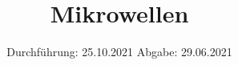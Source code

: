 
\setlength\parindent{0pt}
\subject{V53}
\title{Mikrowellen}
\date{%
  Durchführung: 25.10.2021
  \hspace{3em}
  Abgabe: 29.06.2021 \\
}



\maketitle
\thispagestyle{empty}
\tableofcontents
\newpage






\newpage
\nocite{*}
\printbibliography


